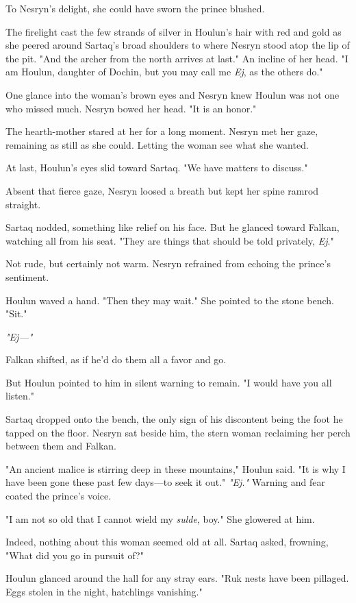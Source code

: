 To Nesryn's delight, she could have sworn the prince blushed.

The firelight cast the few strands of silver in Houlun's hair with red and gold as she peered around Sartaq's broad shoulders to where Nesryn stood atop the lip of the pit.
"And the archer from the north arrives at last."
An incline of her head.
"I am Houlun, daughter of Dochin, but you may call me \emph{Ej}, as the others do."

One glance into the woman's brown eyes and Nesryn knew Houlun was not one who missed much.
Nesryn bowed her head.
"It is an honor."

The hearth-mother stared at her for a long moment.
Nesryn met her gaze, remaining as still as she could.
Letting the woman see what she wanted.

At last, Houlun's eyes slid toward Sartaq.
"We have matters to discuss."

Absent that fierce gaze, Nesryn loosed a breath but kept her spine ramrod straight.

Sartaq nodded, something like relief on his face.
But he glanced toward Falkan, watching all from his seat.
"They are things that should be told privately, \emph{Ej}."

Not rude, but certainly not warm.
Nesryn refrained from echoing the prince's sentiment.

Houlun waved a hand.
"Then they may wait."
She pointed to the stone bench.
"Sit."

\emph{"Ej---"}

Falkan shifted, as if he'd do them all a favor and go.

But Houlun pointed to him in silent warning to remain.
"I would have you all listen."

Sartaq dropped onto the bench, the only sign of his discontent being the foot he tapped on the floor.
Nesryn sat beside him, the stern woman reclaiming her perch between them and Falkan.

"An ancient malice is stirring deep in these mountains," Houlun said.
"It is why I have been gone these past few days---to seek it out."
\emph{"Ej."} Warning and fear coated the prince's voice.

"I am not so old that I cannot wield my \emph{sulde}, boy."
She glowered at him.

Indeed, nothing about this woman seemed old at all.
Sartaq asked, frowning, "What did you go in pursuit of?"

Houlun glanced around the hall for any stray ears.
"Ruk nests have been pillaged.
Eggs stolen in the night, hatchlings vanishing."

